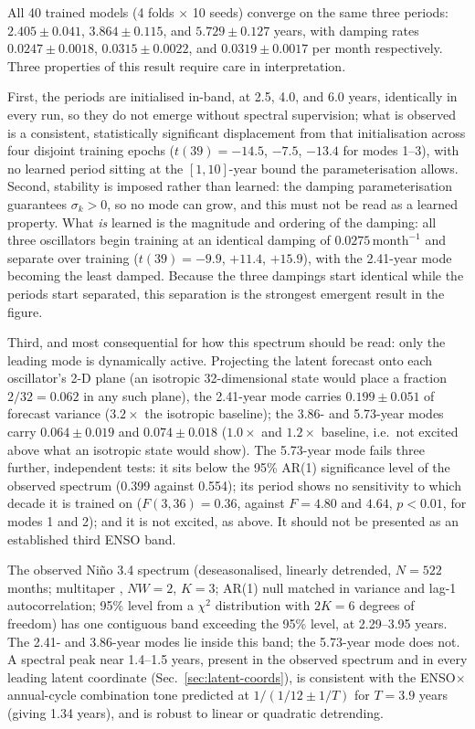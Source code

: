 All 40 trained models (4 folds $\times$ 10 seeds) converge on the same three periods:
$2.405\pm0.041$, $3.864\pm0.115$, and $5.729\pm0.127$ years, with damping rates
$0.0247\pm0.0018$, $0.0315\pm0.0022$, and $0.0319\pm0.0017$ per month respectively. Three
properties of this result require care in interpretation.

First, the periods are initialised in-band, at 2.5, 4.0, and 6.0 years, identically in every
run, so they do not emerge without spectral supervision; what is observed is a consistent,
statistically significant displacement from that initialisation across four disjoint training
epochs ($t(39)=-14.5$, $-7.5$, $-13.4$ for modes 1--3), with no learned period sitting at the
$[1,10]$-year bound the parameterisation allows. Second, stability is imposed rather than
learned: the damping parameterisation guarantees $\sigma_k>0$, so no mode can grow, and this
must not be read as a learned property. What \emph{is} learned is the magnitude and ordering
of the damping: all three oscillators begin training at an identical damping of
$0.0275\,\mathrm{month}^{-1}$ and separate over training ($t(39)=-9.9$, $+11.4$, $+15.9$), with
the 2.41-year mode becoming the least damped. Because the three dampings start identical while
the periods start separated, this separation is the strongest emergent result in the figure.

Third, and most consequential for how this spectrum should be read: only the leading mode is
dynamically active. Projecting the latent forecast onto each oscillator's 2-D plane (an
isotropic 32-dimensional state would place a fraction $2/32=0.062$ in any such plane), the
2.41-year mode carries $0.199\pm0.051$ of forecast variance ($3.2\times$ the isotropic
baseline); the 3.86- and 5.73-year modes carry $0.064\pm0.019$ and $0.074\pm0.018$
($1.0\times$ and $1.2\times$ baseline, i.e.\ not excited above what an isotropic state would
show). The 5.73-year mode fails three further, independent tests: it sits below the 95\%
AR(1) significance level of the observed spectrum (0.399 against 0.554); its period shows no
sensitivity to which decade it is trained on ($F(3,36)=0.36$, against $F=4.80$ and $4.64$,
$p<0.01$, for modes 1 and 2); and it is not excited, as above. It should not be presented as an
established third ENSO band.

The observed Ni\~no 3.4 spectrum (deseasonalised, linearly detrended, $N=522$ months;
multitaper \citep{Thomson1982}, $NW=2$, $K=3$; AR(1) null matched in variance and lag-1 autocorrelation; 95\% level
from a $\chi^2$ distribution with $2K=6$ degrees of freedom) has one contiguous band exceeding
the 95\% level, at 2.29--3.95 years. The 2.41- and 3.86-year modes lie inside this band; the
5.73-year mode does not. A spectral peak near 1.4--1.5 years, present in the observed spectrum
and in every leading latent coordinate (Sec.~\ref{sec:latent-coords}), is consistent with the
ENSO$\times$annual-cycle combination tone predicted at $1/(1/12\pm1/T)$ for $T=3.9$ years
(giving 1.34 years), and is robust to linear or quadratic detrending.

